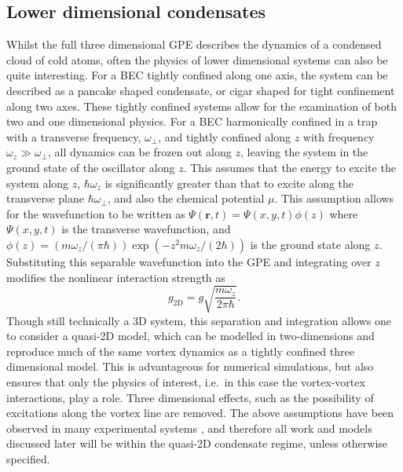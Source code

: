 \subsection{Lower dimensional condensates}\label{sub:coldatom_recent}
Whilst the full three dimensional GPE describes the dynamics of a condensed cloud of cold atoms, often the physics of lower dimensional systems can also be quite interesting. For a BEC tightly confined along one axis, the system can be described as a pancake shaped condensate, or cigar shaped for tight confinement along two axes. These tightly confined systems allow for the examination of both two and one dimensional physics. For a BEC harmonically confined in a trap with a transverse frequency, $\omega_\perp$, and tightly confined along $z$ with frequency $\omega_z \gg \omega_\perp$, all dynamics can be frozen out along $z$, leaving the system in the ground state of the oscillator along $z$. This assumes that the energy to excite the system along $z$, $\hbar\omega_z$ is significantly greater than that to excite along the transverse plane $\hbar\omega_\perp$, and also the chemical potential $\mu$. This assumption allows for the wavefunction to be written as $\Psi(\mathbf{r},t) = \Psi(x,y,t)\phi(z)$ where $\Psi(x,y,t)$ is the transverse wavefunction, and $\phi(z) = \left({m\omega_z/(\pi\hbar)}\right)\exp\left(-z^2{m\omega_z/(2\hbar)}\right)$ is the ground state along $z$.
Substituting this separable wavefunction into the GPE and integrating over $z$ modifies the nonlinear interaction strength as~\cite{BK:Pethick_Smith_2008}
\begin{equation}\label{eqn:g2d_efint}
    g_{\textrm{2D}} = g\sqrt{\frac{m\omega_z}{2\pi\hbar}}.
\end{equation}
Though still technically a 3D system, this separation and integration allows one to consider a quasi-2D model, which can be modelled in two-dimensions and reproduce much of the same vortex dynamics as a tightly confined three dimensional model. This is advantageous for numerical simulations, but also ensures that only the physics of interest, i.e.\ in this case the vortex-vortex interactions, play a role. Three dimensional effects, such as the possibility of excitations along the vortex line are removed. The above assumptions have been observed in many experimental systems \cite{BEC:Gorlitz_prl_2001,BEC:Stock_prl_2005,Vtx:Neely_prl_2010,VTX:Kwon_pra_2014,BEC:Seo_jkps_2014,BEC:Chomaz_natcom_2015}, and therefore all work and models discussed later will be within the quasi-2D condensate regime, unless otherwise specified.
